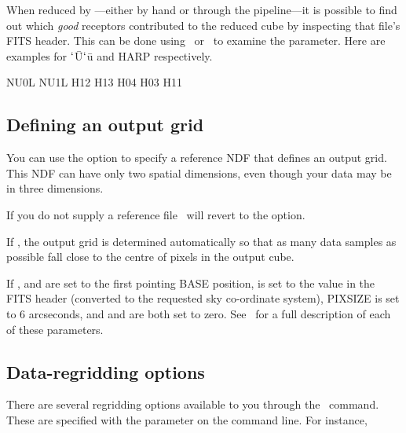 \documentclass[11pt,oneside,chapters]{starlink}
\begin{document}
When reduced by \makecube---either by hand or through the
pipeline---it is possible to find out which \emph{good} receptors
contributed to the reduced cube by inspecting that file's FITS header.
This can be done using \fitslist\ or \fitsval\ to examine the
 parameter.  Here are examples for $`$\=U$`$\=u and HARP
respectively.

\begin{terminalv}
NU0L NU1L
H12 H13 H04 H03 H11
\end{terminalv}


\subsection{Defining an output grid}
\label{sec:outputgrid}
You can use the  option to specify a reference NDF that
defines an output grid. This NDF can have only two spatial dimensions,
even though your data may be in three dimensions.
\begin{terminalv}
\end{terminalv}

If you do not supply a reference file \makecube\ will revert to the
 option.

If , the output grid is determined automatically
so that as many data samples as possible fall close to the centre of
pixels in the output cube.

If ,  and  are set to
the first pointing BASE position,  is set to the
 value in the FITS header (converted to the requested
sky co-ordinate system), PIXSIZE is set to 6 arcseconds, and
 and  are both set to zero. See
\smurfsun\ for a full description of each of these parameters.

\subsection{Data-regridding options}
\label{sec:gridding}

There are several regridding options available to you through the
\makecube\ command. These are specified with the 
parameter on the command line.  For instance,
\begin{terminalv}
\end{terminalv}
\end{document}
